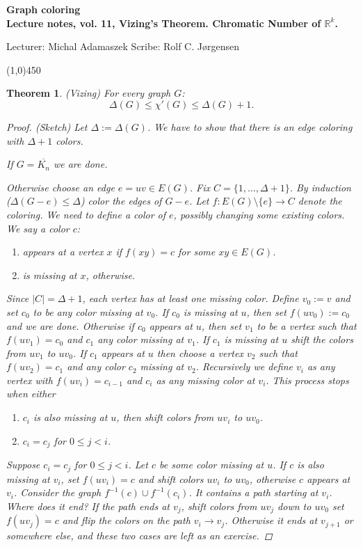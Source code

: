 \documentclass[a4paper]{article}
\theoremstyle{plain}
\newtheorem{theorem}[lemma]{Theorem}
\theoremstyle{myremark}
\newcommand{\LECTURENUMBER}{11}
\newcommand{\LECTURETITLE}{Vizing's Theorem. Chromatic Number of
$\mathbb{R}^k$.}
\newcommand{\LECTURESCRIBE}{Rolf C. Jørgensen}
\begin{document}
\thispagestyle{empty}

\begin{center}
	{\Large\bf Graph coloring}\\
	{\bf Lecture notes, vol. \LECTURENUMBER, \LECTURETITLE}\\
\end{center}
Lecturer: Michal Adamaszek \hfill Scribe: \LECTURESCRIBE
\begin{center}
\line(1,0){450}
\end{center}


\begin{theorem} (Vizing)
For every graph $G$:
\[
\Delta(G) \le \chi'(G) \le \Delta(G) + 1.
\]
\begin{proof} (Sketch)
Let $\Delta := \Delta(G)$. We have to show that there is an edge coloring with
$\Delta + 1$ colors.

If $G = \overline{K_n}$ we are done.

Otherwise choose an edge $e = uv \in E(G)$. Fix $C = \{1, \ldots, \Delta
+ 1\}$. By induction ($\Delta(G-e) \le \Delta$) color the edges of $G -
e$. Let $f \colon E(G) \setminus \{e\} \rightarrow C$ denote the
coloring. We need to define a color of $e$, possibly changing some
existing colors. We say a color $c$:
\begin{enumerate}
\item \emph{appears at a vertex $x$} if $f(xy) = c$ for some $xy \in
E(G)$. 
\item \emph{is missing at $x$}, otherwise.
\end{enumerate}
Since $|C| = \Delta + 1$, each vertex has at
least one missing color. Define $v_0 := v$ and set $c_0$ to be any color
missing at $v_0$. If $c_0$ is missing at $u$, then set $f(uv_0) := c_0$
and we are done. Otherwise if $c_0$ appears at $u$, then set $v_1$ to be
a vertex such that $f(uv_1) = c_0$ and $c_1$ any color missing at $v_1$.
If $c_1$ is missing at $u$ shift the colors from $uv_1$ to $uv_0$. If
$c_1$ appears at $u$ then choose a vertex $v_2$ such that $f(uv_2) =
c_1$ and any color $c_2$ missing at $v_2$. Recursively we define $v_i$
as any vertex with $f(uv_i) = c_{i-1}$ and $c_i$ as any missing color at
$v_i$. This process stops when either 
\begin{enumerate}
\item $c_i$ is also missing at $u$, then shift colors from $uv_i$ to
$uv_0$.
\item $c_i = c_j$ for $0 \le j < i$.
\end{enumerate}
Suppose $c_i = c_j$ for $0 \le j < i$. Let $c$ be some color missing at
$u$. If $c$ is also missing at $v_i$, set $f(uv_i) = c$ and shift colors
$uv_i$ to $uv_0$, otherwise $c$ appears at $v_i$. Consider the graph
$f^{-1}(c) \cup f^{-1}(c_i)$. It contains a path starting at $v_i$.
Where does it end? If the path ends at $v_j$, shift colors from $uv_j$
down to $uv_0$ set $f(uv_j) = c$ and flip the colors on the path $v_i
\rightarrow v_j$. Otherwise it ends at $v_{j+1}$ or somewhere else, and these two cases are left as an exercise.
\end{proof}
\end{theorem}
\end{document}
